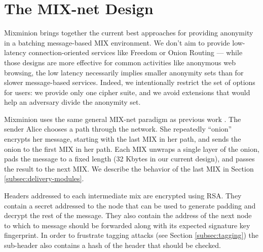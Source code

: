 \documentclass{llncs}
\begin{document}

\section{The MIX-net Design}
\label{sec:design}

Mixminion brings together the current best approaches for providing
anonymity in a batching message-based MIX environment. We don't aim
to provide low-latency connection-oriented services like Freedom
\cite{freedom} or Onion Routing \cite{goldschlag99} --- while those
designs are more effective for common activities like anonymous web
browsing, the low latency necessarily implies smaller anonymity sets
than for slower message-based services. Indeed, we intentionally
restrict the set of options for users: we provide only one
cipher suite, and we avoid extensions that would help an adversary
divide the anonymity set.

Mixminion uses the same general MIX-net paradigm as previous work
\cite{chaum-mix,mixmaster-attacks,babel}. The sender Alice chooses a
path through the network. She repeatedly ``onion'' encrypts her message,
starting with the last
MIX in her path, and sends the onion to the first MIX in her path. Each
MIX unwraps a single layer of the onion, pads the message to a fixed
length (32 Kbytes in our current design), and passes the result to the
next MIX. We describe the behavior of the last MIX in
Section \ref{subsec:delivery-modules}.


Headers addressed to each intermediate mix are encrypted using RSA.
They contain a secret addressed
to the node that can be used to generate padding and decrypt the rest
of the message. They also contain the address of the next node to 
which to message should be forwarded along with its expected signature 
key fingerprint. In order to frustrate tagging attacks (see
Section \ref{subsec:tagging}) the sub-header also contains a hash of
the header that
should be checked. 

\end{document}
